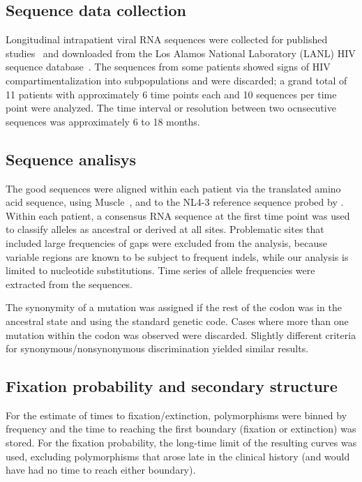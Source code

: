 \documentclass[rmp, twocolumn]{revtex4}
\begin{document}
\subsection{Sequence data collection}
Longitudinal intrapatient viral RNA sequences were collected for published
studies~\citep{shankarappa_consistent_1999,
liu_selection_2006, bunnik_autologous_2008} and downloaded from the Los Alamos
National Laboratory (LANL) HIV sequence database~\citep{LANL2012}. The sequences from
some patients showed signs of HIV compartimentalization into subpopulations and
were discarded; a grand total of 11
patients with approximately 6 time points each and 10 sequences per time point
were analyzed. The time interval or resolution between two ocnsecutive sequences
was approximately 6 to 18 months.

\subsection{Sequence analisys}
The good sequences were aligned within each patient
via the translated amino acid sequence, using
Muscle~\citep{edgar_muscle:_2004}, and to the NL4-3 reference sequence probed
by \citet{watts_architecture_2009}. Within each patient, a consensus RNA
sequence at the first time point was used to classify alleles as ancestral or
derived at all sites. Problematic sites that included large frequencies of gaps
were excluded from the analysis, because variable regions are known to be
subject to frequent indels, while our analysis is limited to nucleotide
substitutions. Time series of allele frequencies were extracted from the
sequences.

The synonymity of a mutation was assigned if the rest of the codon was
in the ancestral state and using the standard genetic code. Cases where more
than one mutation within the codon was observed were discarded. Slightly
different criteria for synonymous/nonsynonymous discrimination yielded similar
results.

\subsection{Fixation probability and secondary structure}
For the estimate of times to fixation/extinction, polymorphisms were
binned by frequency and the time to reaching the first boundary (fixation or
extinction) was stored. For the fixation probability, the long-time limit of the
resulting curves was used, excluding polymorphisms that arose late in the
clinical history (and would have had no time to reach either boundary).
\end{document}
